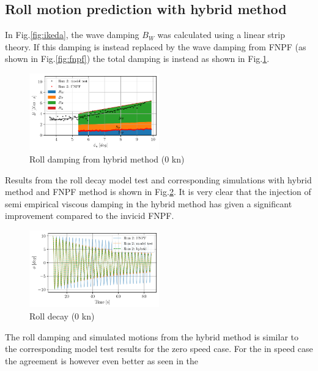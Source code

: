 \subsection*{Roll motion prediction with hybrid
method}\label{roll-motion-prediction-with-hybrid-method}
In Fig.\ref{fig:ikeda}, the wave damping $B_W$ was calculated
using a linear strip theory. If this damping is instead replaced by the
wave damping from FNPF (as shown in Fig.\ref{fig:fnpf}) the
total damping is instead as shown in Fig.\ref{fig:hybrid_0}.
\begin{figure}[H]
\begin{center}\includegraphics[width = 0.5\textwidth]{figures/hybrid_0.pdf}\end{center}
\vspace{-1cm}
\caption{Roll damping from hybrid method (0 kn)}
\label{fig:hybrid_0}
\end{figure}
Results from the roll decay model test and corresponding simulations
with hybrid method and FNPF method is shown in
Fig.\ref{fig:hybrid_0_time}. It is very clear that the injection
of semi empirical viscous damping in the hybrid method has given a
significant improvement compared to the invicid FNPF.
\begin{figure}[H]
\begin{center}\includegraphics[width = 0.5\textwidth]{figures/hybrid_0_time.pdf}\end{center}
\vspace{-1cm}
\caption{Roll decay (0 kn)}
\label{fig:hybrid_0_time}
\end{figure}
The roll damping and simulated motions from the hybrid method is similar
to the corresponding model test results for the zero speed case. For the
in speed case the agreement is however even better as seen in the
